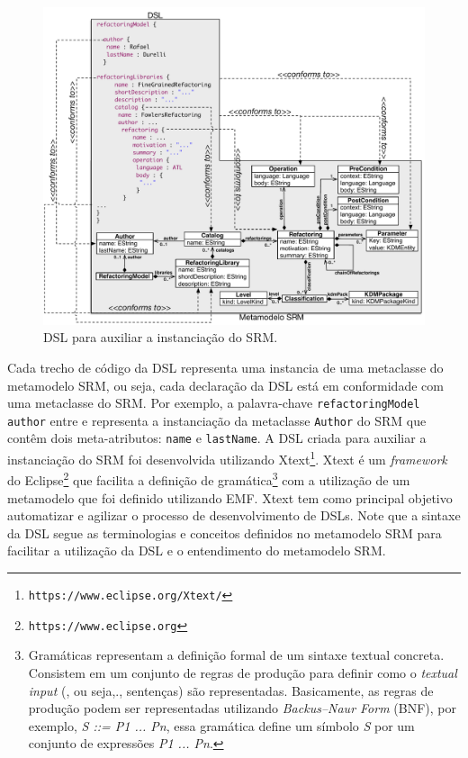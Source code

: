 \begin{figure}[!h]
	\centering
	\caption{DSL para auxiliar a instanciação do SRM.}
	\label{fig:DSL_SRM}
	\includegraphics[scale=0.6]{images/MetaModelEDSL}
	\fautor
\end{figure}

Cada trecho de código da DSL representa uma instancia de uma metaclasse do metamodelo SRM, ou seja, cada declaração da DSL está em conformidade com uma metaclasse do SRM. Por exemplo, a palavra-chave \texttt{refactoringModel} \texttt{author} entre \aspas{\{} e \aspas{\}} representa a instanciação da metaclasse \texttt{Author} do SRM que contêm dois meta-atributos: \texttt{name} e \texttt{lastName}. A DSL criada para auxiliar a instanciação do SRM foi desenvolvida utilizando Xtext\footnote{\texttt{https://www.eclipse.org/Xtext/}}. Xtext é um \textit{framework} do Eclipse\footnote{\texttt{https://www.eclipse.org}} que facilita a definição de gramática\footnote{Gramáticas representam a definição formal de um sintaxe textual concreta. Consistem em um conjunto de regras de produção para definir como o \textit{textual input} (, ou seja,., sentenças) são representadas. Basicamente, as regras de produção podem ser representadas utilizando \textit{Backus–Naur Form} (BNF), por exemplo, \textit{S ::= P1 ... Pn}, essa gramática define um símbolo \textit{S} por um conjunto de expressões \textit{P1 ... Pn}.} 
com a utilização de um metamodelo que foi definido utilizando EMF. Xtext tem como principal objetivo automatizar e agilizar o processo de desenvolvimento de DSLs. Note que a sintaxe da DSL segue as terminologias e conceitos definidos no metamodelo SRM para facilitar a utilização da DSL e o entendimento do metamodelo SRM.

